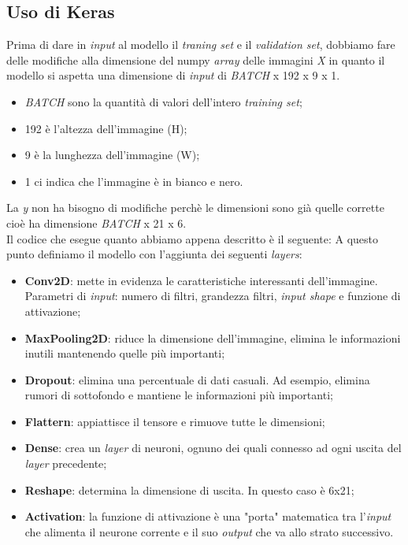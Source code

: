 \subsection{Uso di Keras}
Prima di dare in \textit{input} al modello il \textit{traning set} e il \textit{validation set}, dobbiamo fare delle modifiche alla dimensione del numpy \textit{array} delle immagini \textit{X} in quanto il modello si aspetta una dimensione di \textit{input} di \textit{BATCH} x 192 x 9 x 1.
\begin{itemize}
	\item \textit{BATCH} sono la quantità di valori dell'intero \textit{training set};
	\item 192 è l'altezza dell'immagine (H);
	\item 9 è la lunghezza dell'immagine (W);
	\item 1 ci indica che l'immagine è in bianco e nero.
\end{itemize}
La \textit{y} non ha bisogno di modifiche perchè le dimensioni sono già quelle corrette cioè ha dimensione \textit{BATCH} x 21 x 6.\\
\newline
Il codice che esegue quanto abbiamo appena descritto è il seguente:
\vspace*{2ex}
\vspace*{2ex}
A questo punto definiamo il modello con l'aggiunta dei seguenti \textit{layers}:
\begin{itemize}
	\item \textbf{Conv2D}: mette in evidenza le caratteristiche interessanti dell'immagine. Parametri di \textit{input}: numero di filtri, grandezza filtri, \textit{input shape} e funzione di attivazione;
	\item \textbf{MaxPooling2D}: riduce la dimensione dell'immagine, elimina le informazioni inutili mantenendo quelle più importanti;
	\item \textbf{Dropout}: elimina una percentuale di dati casuali. Ad esempio, elimina rumori di sottofondo e mantiene le informazioni più importanti;
	\item \textbf{Flattern}: appiattisce il tensore e rimuove tutte le dimensioni;
	\item \textbf{Dense}: crea un \textit{layer} di neuroni, ognuno dei quali connesso ad ogni uscita del \textit{layer} precedente;
	\item \textbf{Reshape}: determina la dimensione di uscita. In questo caso è 6x21;
	\item \textbf{Activation}: la funzione di attivazione è una "porta" matematica tra l'\textit{input} che alimenta il neurone corrente e il suo \textit{output} che va allo strato successivo.
\end{itemize}
